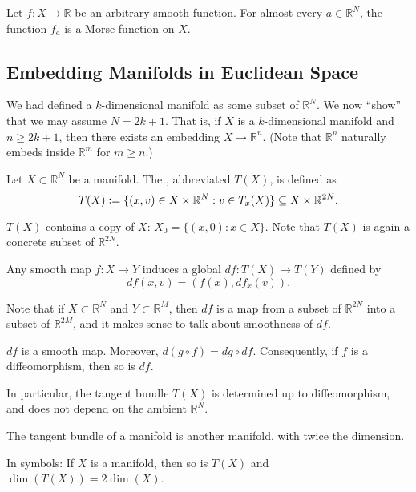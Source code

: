\begin{thm}
	Let $f : X \to \mathbb{R}$ be an arbitrary smooth function. For almost every $a \in \mathbb{R}^{N}$, the function $f_{a}$ is a Morse function on $X$.
\end{thm}

\subsection{Embedding Manifolds in Euclidean Space}

We had defined a $k$-dimensional manifold as some subset of $\mathbb{R}^{N}$. We now ``show'' that we may assume $N = 2k + 1$. That is, if $X$ is a $k$-dimensional manifold and $n \ge 2k + 1$, then there exists an embedding $X \to \mathbb{R}^{n}$. (Note that $\mathbb{R}^{n}$ naturally embeds inside $\mathbb{R}^{m}$ for $m \ge n$.)

\begin{defn}
	Let $X \subset \mathbb{R}^{N}$ be a manifold. The , abbreviated $T(X)$, is defined as
	\begin{equation*} 
		T(X) \vcentcolon= \{(x, v) \in X \times \mathbb{R}^{N} : v \in T_{x}(X)\} \subset X \times \mathbb{R}^{2N}.
	\end{equation*}
\end{defn}
$T(X)$ contains a copy of $X$: $X_{0} = \{(x, 0) : x \in X\}$. Note that $T(X)$ is again a concrete subset of $\mathbb{R}^{2N}$.

\begin{defn}
	Any smooth map $f : X \to Y$ induces a global  $df : T(X) \to T(Y)$ defined by
	\begin{equation*} 
		df(x, v) = (f(x), df_{x}(v)).
	\end{equation*}
\end{defn}

Note that if $X \subset \mathbb{R}^{N}$ and $Y \subset \mathbb{R}^{M}$, then $df$ is a map from a subset of $\mathbb{R}^{2N}$ into a subset of $\mathbb{R}^{2M}$, and it makes sense to talk about smoothness of $df$.

\begin{prop}
	$df$ is a smooth map. Moreover, $d(g \circ f) = dg \circ df$. Consequently, if $f$ is a diffeomorphism, then so is $df$.
\end{prop}
In particular, the tangent bundle $T(X)$ is determined up to diffeomorphism, and does not depend on the ambient $\mathbb{R}^{N}$.

\begin{prop}
	The tangent bundle of a manifold is another manifold, with twice the dimension.

	In symbols: If $X$ is a manifold, then so is $T(X)$ and $\dim(T(X)) = 2 \dim(X)$.
\end{prop}

